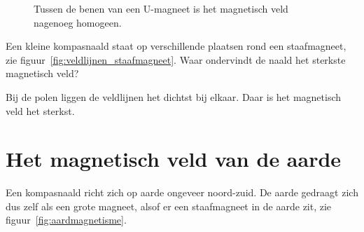 \documentclass{ximera}
\begin{document}
\begin{figure}[ht!]
    \captionsetup{width=0.85\textwidth}
    \begin{center}
    \end{center}
    \caption{Tussen de benen van een U-magneet is het magnetisch veld nagenoeg homogeen.}
    \label{fig:homogeen_magnetisch_veld}
\end{figure}

\begin{question}
    Een kleine kompasnaald staat op verschillende plaatsen rond een staafmagneet, zie figuur~\ref{fig:veldlijnen_staafmagneet}. Waar ondervindt de naald het sterkste magnetisch veld?

    \begin{multipleChoice}
    \end{multipleChoice}

    \begin{solution}\nl
        Bij de polen liggen de veldlijnen het dichtst bij elkaar. Daar is het magnetisch veld het sterkst.
    \end{solution}
\end{question}

\section{Het magnetisch veld van de aarde}\label{sec:aardmagnetisme}
Een kompasnaald richt zich op aarde ongeveer noord-zuid. De aarde gedraagt zich dus zelf als een grote magneet, alsof er een staafmagneet in de aarde zit, zie figuur~\ref{fig:aardmagnetisme}.
\end{document}
